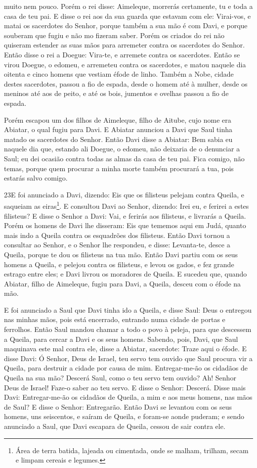 muito nem pouco. Porém o rei disse: Aimeleque, morrerás
certamente, tu e toda a casa de teu pai. E disse o rei aos da
sua guarda que estavam com ele: Virai-vos, e matai os sacerdotes do
Senhor, porque também a sua mão é com Davi, e porque souberam que
fugiu e não mo fizeram saber. Porém os criados do rei não quiseram
estender as suas mãos para arremeter contra os sacerdotes do Senhor.
Então disse o rei a Doegue: Vira-te, e arremete contra os
sacerdotes. Então se virou Doegue, o edomeu, e arremeteu contra os
sacerdotes, e matou naquele dia oitenta e cinco homens que vestiam
éfode de linho. Também a Nobe, cidade destes sacerdotes,
passou a fio de espada, desde o homem até à mulher, desde os meninos
até aos de peito, e até os bois, jumentos e ovelhas passou a fio de
espada.

Porém escapou um dos filhos de Aimeleque, filho de Aitube, cujo
nome era Abiatar, o qual fugiu para Davi. E Abiatar anunciou
a Davi que Saul tinha matado os sacerdotes do Senhor. Então
Davi disse a Abiatar: Bem sabia eu naquele dia que, estando ali
Doegue, o edomeu, não deixaria de o denunciar a Saul; eu dei ocasião
contra todas as almas da casa de teu pai. Fica comigo, não
temas, porque quem procurar a minha morte também procurará a tua,
pois estarás salvo comigo.

\medskip

\lettrine{23} E foi anunciado a Davi, dizendo: Eis que os
filisteus pelejam contra Queila, e saqueiam as eiras\footnote{Área
de terra batida, lajeada ou cimentada, onde se malham, trilham,
secam e limpam cereais e legumes.}. E consultou Davi ao Senhor,
dizendo: Irei eu, e ferirei a estes filisteus? E disse o Senhor a
Davi: Vai, e ferirás aos filisteus, e livrarás a Queila. Porém
os homens de Davi lhe disseram: Eis que tememos aqui em Judá, quanto
mais indo a Queila contra os esquadrões dos filisteus. Então
Davi tornou a consultar ao Senhor, e o Senhor lhe respondeu, e
disse: Levanta-te, desce a Queila, porque te dou os filisteus na tua
mão. Então Davi partiu com os seus homens a Queila, e pelejou
contra os filisteus, e levou os gados, e fez grande estrago entre
eles; e Davi livrou os moradores de Queila. E sucedeu que,
quando Abiatar, filho de Aimeleque, fugiu para Davi, a Queila,
desceu com o éfode na mão.

E foi anunciado a Saul que Davi tinha ido a Queila, e disse Saul:
Deus o entregou nas minhas mãos, pois está encerrado, entrando numa
cidade de portas e ferrolhos. Então Saul mandou chamar a todo o
povo à peleja, para que descessem a Queila, para cercar a Davi e os
seus homens. Sabendo, pois, Davi, que Saul maquinava este mal
contra ele, disse a Abiatar, sacerdote: Traze aqui o éfode. E
disse Davi: Ó Senhor, Deus de Israel, teu servo tem ouvido que Saul
procura vir a Queila, para destruir a cidade por causa de mim.
Entregar-me-ão os cidadãos de Queila na sua mão? Descerá
Saul, como o teu servo tem ouvido? Ah! Senhor Deus de Israel! Faze-o
saber ao teu servo. E disse o Senhor: Descerá. Disse mais
Davi: Entregar-me-ão os cidadãos de Queila, a mim e aos meus homens,
nas mãos de Saul? E disse o Senhor: Entregarão. Então Davi se
levantou com os seus homens, uns seiscentos, e saíram de Queila, e
foram-se aonde puderam; e sendo anunciado a Saul, que Davi escapara
de Queila, cessou de sair contra ele.


